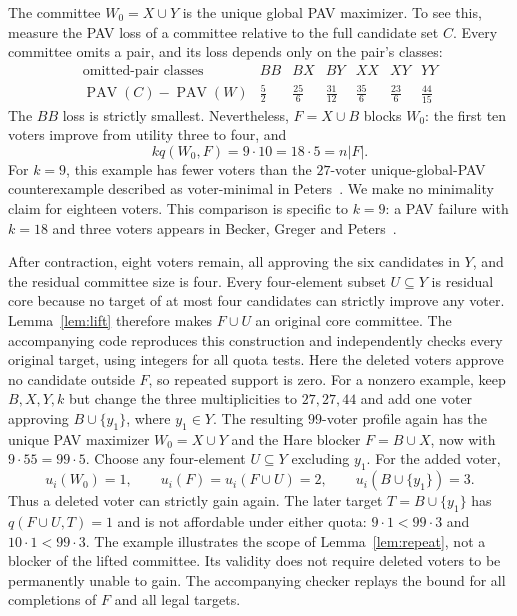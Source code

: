 \documentclass[11pt]{article}
\newcommand{\PAV}{\operatorname{PAV}}
\begin{document}
The committee $W_0=X\cup Y$ is the unique global PAV maximizer.
To see this, measure the PAV loss of a committee relative to the full
candidate set $C$. Every committee omits a pair, and its loss depends
only on the pair's classes:
\[
\begin{array}{c|rrrrrr}
\text{omitted-pair classes}&BB&BX&BY&XX&XY&YY\\ \hline
\PAV(C)-\PAV(W)&\frac52&\frac{25}6&\frac{31}{12}&
\frac{35}6&\frac{23}6&\frac{44}{15}
\end{array}
\]
The $BB$ loss is strictly smallest. Nevertheless,
$F=X\cup B$ blocks $W_0$: the first ten voters improve from utility
three to four, and
\[
 kq(W_0,F)=9\cdot10=18\cdot5=n|F|.
\]
For $k=9$, this example has fewer voters than the $27$-voter
unique-global-PAV counterexample described as voter-minimal in
Peters~\cite[Section 4.3]{Peters2025}. We make no minimality claim for
eighteen voters. This comparison is specific to $k=9$: a PAV failure with
$k=18$ and three voters appears in Becker, Greger and
Peters~\cite[Figure~1]{BGP2026}.

After contraction, eight voters remain, all approving the six candidates
in $Y$, and the residual committee size is four. Every four-element
subset $U\subseteq Y$ is residual core because no target of at most
four candidates can strictly improve any voter. Lemma~\ref{lem:lift}
therefore makes $F\cup U$ an original core committee.
The accompanying code reproduces this construction and independently
checks every original target, using integers for all quota tests.
Here the deleted voters approve no candidate outside $F$, so repeated
support is zero. For a nonzero example, keep $B,X,Y,k$ but change the
three multiplicities to $27,27,44$ and add one voter approving
$B\cup\{y_1\}$, where $y_1\in Y$.
The resulting $99$-voter profile again has the unique PAV maximizer
$W_0=X\cup Y$ and the Hare blocker $F=B\cup X$, now with
$9\cdot55=99\cdot5$.
Choose any four-element $U\subseteq Y$ excluding $y_1$.
For the added voter,
\[
 u_i(W_0)=1,\qquad u_i(F)=u_i(F\cup U)=2,\qquad
 u_i(B\cup\{y_1\})=3.
\]
Thus a deleted voter can strictly gain again. The later target
$T=B\cup\{y_1\}$ has $q(F\cup U,T)=1$ and is not affordable under
either quota: $9\cdot1<99\cdot3$ and $10\cdot1<99\cdot3$.
The example illustrates the scope of Lemma~\ref{lem:repeat}, not a
blocker of the lifted committee. Its validity does not require deleted
voters to be permanently unable to gain. The accompanying checker
replays the bound for all completions of $F$ and all legal targets.
\end{document}

